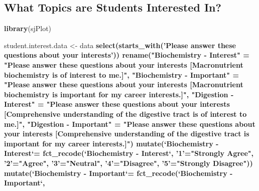 \documentclass[]{article}
\newenvironment{Shaded}{\begin{snugshade}}{\end{snugshade}}
\newcommand{\KeywordTok}[1]{\textcolor[rgb]{0.13,0.29,0.53}{\textbf{#1}}}
\newcommand{\DataTypeTok}[1]{\textcolor[rgb]{0.13,0.29,0.53}{#1}}
\newcommand{\StringTok}[1]{\textcolor[rgb]{0.31,0.60,0.02}{#1}}
\newcommand{\OperatorTok}[1]{\textcolor[rgb]{0.81,0.36,0.00}{\textbf{#1}}}
\newcommand{\NormalTok}[1]{#1}
\begin{document}
\subsection{What Topics are Students Interested
In?}\label{what-topics-are-students-interested-in}

\begin{Shaded}
\begin{Highlighting}[]
\KeywordTok{library}\NormalTok{(sjPlot)}

\NormalTok{student.interest.data <-}\StringTok{ }
\StringTok{  }\NormalTok{data }\OperatorTok{%
\StringTok{  }\KeywordTok{select}\NormalTok{(}\KeywordTok{starts_with}\NormalTok{(}\StringTok{'Please answer these questions about your interests'}\NormalTok{)) }\OperatorTok{%
\StringTok{  }\KeywordTok{rename}\NormalTok{(}\StringTok{"Biochemistry - Interest"}\NormalTok{ =}\StringTok{ "Please answer these questions about your interests [Macronutrient biochemistry is of interest to me.]"}\NormalTok{,}
         \StringTok{"Biochemistry - Important"}\NormalTok{ =}\StringTok{ "Please answer these questions about your interests [Macronutrient biochemistry is important for my career interests.]"}\NormalTok{,}
         \StringTok{"Digestion - Interest"}\NormalTok{ =}\StringTok{ "Please answer these questions about your interests [Comprehensive understanding of the digestive tract is of interest to me.]"}\NormalTok{,}
         \StringTok{"Digestion - Important"}\NormalTok{ =}\StringTok{ "Please answer these questions about your interests [Comprehensive understanding of the digestive tract is important for my career interests.]"}\NormalTok{) }\OperatorTok{%
\StringTok{  }\KeywordTok{mutate}\NormalTok{(}\StringTok{`}\DataTypeTok{Biochemistry - Interest}\StringTok{`}\NormalTok{=}\StringTok{ }\KeywordTok{fct_recode}\NormalTok{(}\StringTok{`}\DataTypeTok{Biochemistry - Interest}\StringTok{`}\NormalTok{, }
                                                 \StringTok{'1'}\NormalTok{=}\StringTok{"Strongly Agree"}\NormalTok{,}
                                                 \StringTok{'2'}\NormalTok{=}\StringTok{"Agree"}\NormalTok{,}
                                                 \StringTok{'3'}\NormalTok{=}\StringTok{"Neutral"}\NormalTok{,}
                                                 \StringTok{'4'}\NormalTok{=}\StringTok{"Disagree"}\NormalTok{,}
                                                 \StringTok{'5'}\NormalTok{=}\StringTok{"Strongly Disagree"}\NormalTok{)) }\OperatorTok{%
\StringTok{  }\KeywordTok{mutate}\NormalTok{(}\StringTok{`}\DataTypeTok{Biochemistry - Important}\StringTok{`}\NormalTok{=}\StringTok{ }\KeywordTok{fct_recode}\NormalTok{(}\StringTok{`}\DataTypeTok{Biochemistry - Important}\StringTok{`}\NormalTok{, }
}}}}
\end{Highlighting}
\end{Shaded}
\end{document}

